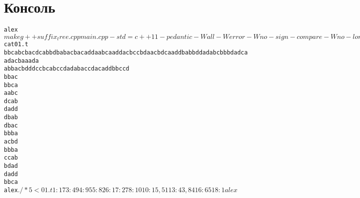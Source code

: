 \section{Консоль}
\begin{alltt}
alex$make
g++ suffix_tree.cpp main.cpp -std=c++11 -pedantic -Wall -Werror -Wno-sign-compare -Wno-long-long -lm -o diskran_laba_5
alex$ cat 01.t 
bbcabcbacdcabbdbabacbacaddaabcaaddacbccbdaacbdcaaddbabbddadabcbbbdadcaadacbaaada\\abbacbdddccbcabccdadabaccdacaddbbccd
bbac
bbca
aabc
dcab
dadd
dbab
dbac
bbba
acbd
bbba
ccab
bdad
dadd
bbca
alex$ ./*5 < 01.t 
1: 17
3: 49
4: 95
5: 82
6: 1
7: 27
8: 10
10: 15, 51
13: 43, 84
16: 65
18: 1
alex$
\end{alltt}
\pagebreak

